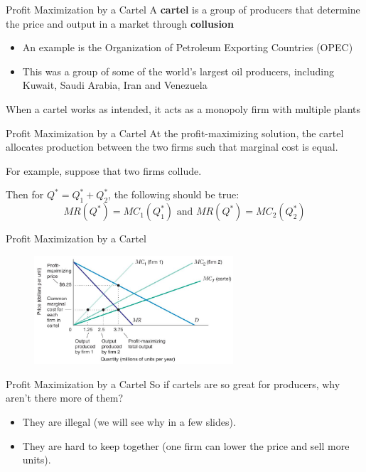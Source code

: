 \documentclass[11pt,t]{beamer}
\begin{document}


\begin{frame}{Profit Maximization by a Cartel}
  A \textbf{cartel} is a group of producers that determine the price and output in a market through \textbf{collusion}

  \begin{itemize}
    \item An example is the Organization of Petroleum Exporting Countries (OPEC)
    \item This was a group of some of the world's largest oil producers, including Kuwait, Saudi Arabia, Iran and Venezuela
  \end{itemize}

  \bigskip
  When a cartel works as intended, it acts as a monopoly firm with multiple plants
\end{frame}

\begin{frame}{Profit Maximization by a Cartel}
  At the profit-maximizing solution, the cartel allocates production between the two firms such that marginal cost is equal.

  \bigskip
  For example, suppose that two firms collude.

  Then for $Q^* = Q^*_1 + Q^*_2$, the following should be true:
  $$
    MR(Q^*) = MC_1(Q_1^*) \text{ and } MR(Q^*) = MC_2(Q^*_2)
  $$
\end{frame}

\begin{frame}{Profit Maximization by a Cartel}
  \begin{figure}
    \includegraphics[width=280px]{figures/fig11_15.jpg}
  \end{figure}
\end{frame}

\begin{frame}{Profit Maximization by a Cartel}
  So if cartels are so great for producers, why aren't there more of them?
  \bigskip\pause

  \begin{itemize}
    \item They are illegal (we will see why in a few slides).
    
    \item They are hard to keep together (one firm can lower the price and sell more units).
  \end{itemize}
\end{frame}
\end{document}
